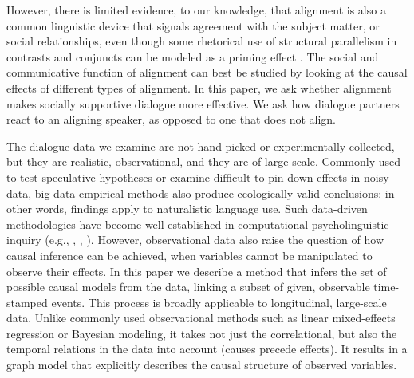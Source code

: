 \documentclass[man,biblatex,floatsintext]{apa6}
\begin{document}

However, there is limited evidence, to our knowledge, that alignment is also a common linguistic device that signals agreement with the subject matter, or social relationships, even though some rhetorical use of structural parallelism in contrasts and conjuncts \parencite{aristotle2015rhetoric} can be modeled as a priming effect \parencite{dubey2008probabilistic}.  The social and communicative function of alignment can best be studied by looking at the causal effects of different types of alignment.  In this paper, we ask whether alignment makes socially supportive dialogue more effective.  We ask how dialogue partners react to an aligning speaker, as opposed to one that does not align.

The dialogue data we examine are not hand-picked or experimentally collected, but they are realistic, observational, and they are of large scale.  Commonly used to test speculative hypotheses or examine difficult-to-pin-down effects in noisy data, big-data empirical methods also produce ecologically valid conclusions: in other words, findings apply to naturalistic language use.  Such data-driven methodologies have become well-established in computational psycholinguistic inquiry (e.g., \cite{gries2005corpusbased}, \cite{jaeger2006speakers}, \cite{reitter2017alignment}).  However, observational data also raise the question of how causal inference can be achieved, when variables cannot be manipulated to observe their effects. In this paper we describe a method that infers  the set of possible causal models from the data, linking a subset of given, observable time-stamped events.    This process is broadly applicable to longitudinal, large-scale data.  Unlike commonly used observational methods such as linear mixed-effects regression or Bayesian modeling, it takes not just the correlational, but also the temporal relations in the data into account (causes precede effects).   It results in a graph model that explicitly describes the causal structure of observed variables.
\end{document}
